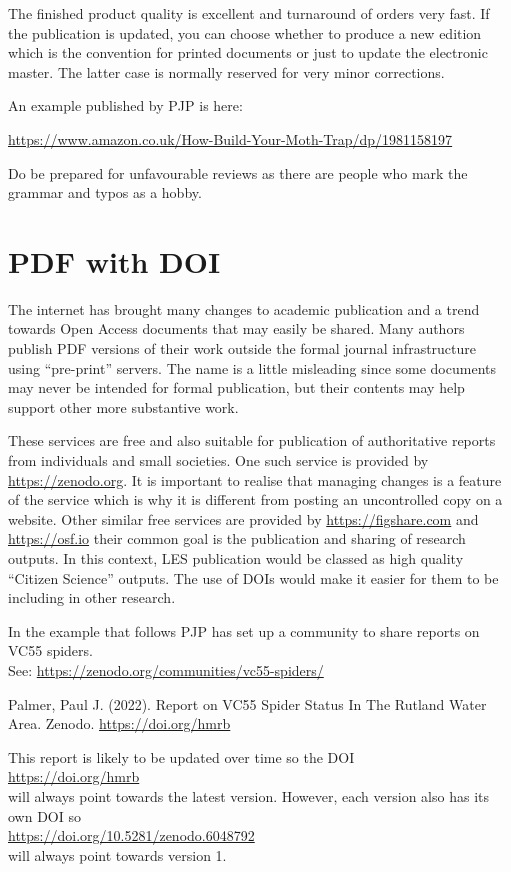 \documentclass{article}
\begin{document}
The finished product quality is excellent and turnaround of orders very fast.  If the publication is updated, you can choose whether to produce a new edition which is the convention for printed documents or just to update the electronic master. The latter case is normally reserved for very minor corrections.

An example published by PJP is here:

\url{https://www.amazon.co.uk/How-Build-Your-Moth-Trap/dp/1981158197}

Do be prepared for unfavourable reviews as there are people who mark the grammar and typos as a hobby.

\section{PDF with DOI}

The internet has brought many changes to academic publication and a trend towards Open Access documents that may easily be shared. Many authors publish PDF versions of their work outside the formal journal infrastructure using \enquote{pre-print} servers. The name is a little misleading since some documents may never be intended for formal publication, but their contents may help support other more substantive work.

These services are free and also suitable for publication of authoritative reports from individuals and small societies. One such service is provided by \url{https://zenodo.org}.  It is important to realise that managing changes is a feature of the service which is why it is different from posting an uncontrolled copy on a website. Other similar free services are provided by \url{https://figshare.com} and \url{https://osf.io} their common goal is the publication and sharing of research outputs. In this context, LES publication would be classed as high quality \enquote{Citizen Science} outputs. The use of DOIs would make it easier for them to be including in other research.

In the example that follows PJP has set up a community to share reports on VC55 spiders. \\
See: \url{https://zenodo.org/communities/vc55-spiders/} 

Palmer, Paul J. (2022). Report on VC55 Spider Status In The Rutland Water Area. Zenodo. \url{https://doi.org/hmrb}

This report is likely to be updated over time so the DOI \\ \url{https://doi.org/hmrb} \\will always point towards the latest version. However, each version also has its own DOI so \\
\url{https://doi.org/10.5281/zenodo.6048792} \\
 will always point towards version 1. 
 
\end{document}
